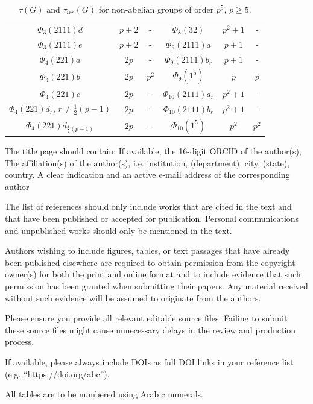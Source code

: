 \documentclass[a4paper,11pt]{amsart}
\numberwithin{equation}{section}
\numberwithin{equation}{subsection}
\newcommand{\poonam}[1]{{\color{blue} #1}}
\begin{document}
\begin{table}[H]
\begin{tabular}{|c|c|c||c|c|c|}
$\Phi_3(2111)d$ & $p+2$ & - & $\Phi_8(32)$ & $p^2+1$ & - \\ 
$\Phi_3(2111)e$ & $p+2$ & - & $\Phi_9(2111)a$ & $p+1$ & - \\ 
$\Phi_4(221)a$ & $2p$ & - & $\Phi_9(2111)b_r$ & $p+1$ & - \\ 
$\Phi_4(221)b$ & $2p$ & $p^2$ & $\Phi_9(1^5)$ & $p$ & $p$ \\ 
$\Phi_4(221)c$ & $2p$ & - & $\Phi_{10}(2111)a_r$ & $p^2+1$ & - \\ 
$\Phi_4(221)d_r, \, r \neq \tfrac{1}{2}(p-1)$ & $2p$ & - & $\Phi_{10}(2111)b_r$ & $p^2+1$ & -  \\ 
$\Phi_4(221)d_{\tfrac{1}{2}(p-1)}$ & $2p$ & - &  $\Phi_{10}(1^5)$ & $p^2$ & $p^2$ \\ 
\hline
\end{tabular}
\caption{$\tau(G)$ and $\tau_{irr}(G)$ for non-abelian groups of order $p^5$, $p \geq 5$.}
\end{table}

\iffalse
\poonam{The title page should contain: If available, the 16-digit ORCID of the author(s), The affiliation(s) of the author(s), i.e. institution, (department), city, (state), country. A clear indication and an active e-mail address of the corresponding author}

\poonam{The list of references should only include works that are cited in the text and that have been published or accepted for publication. Personal communications and unpublished works should only be mentioned in the text.}

\poonam{Authors wishing to include figures, tables, or text passages that have already been published elsewhere are required to obtain permission from the copyright owner(s) for both the print and online format and to include evidence that such permission has been granted when submitting their papers. Any material received without such evidence will be assumed to originate from the authors.}

\poonam{Please ensure you provide all relevant editable source files. Failing to submit these source files might cause unnecessary delays in the review and production process.}

\poonam{If available, please always include DOIs as full DOI links in your reference list (e.g. “https://doi.org/abc”).}

\poonam{All tables are to be numbered using Arabic numerals.}
\end{document}
